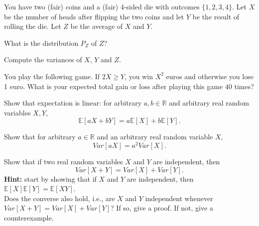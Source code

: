 \documentclass[a4paper,10pt,landscape,twocolumn]{scrartcl}
\begin{document}
\homeworkproblems

\begin{exercise}
	You have two (fair) coins and a (fair) 4-sided die with outcomes $\{1,2,3,4\}$. Let $X$ be the number of
	heads after flipping the two coins and let $Y$ be the result of rolling the
	die. Let $Z$ be the average of $X$ and $Y$.
	\begin{subex}[(2pt)]
		What is the distribution $P_Z$ of $Z$?
	\end{subex}
	\begin{subex}[(3pt)]
		Compute the variances of $X$, $Y$ and $Z$.	
	\end{subex}
	\begin{subex}[(2pt)]
		You play the following game. If $2X \ge Y$, you win $X^2$ euros and
		otherwise you lose 1 euro. What is your expected total gain or loss after
		playing this game $40$ times?
	\end{subex}
\end{exercise}

\begin{exercise}
	\begin{subex}[(2pt)]
		Show that expectation is linear: for arbitrary $a,b \in \mathbb{R}$ and arbitrary real random variables $X,Y$,
		\[
		\mathbb{E}[aX + bY] = a\mathbb{E}[X] + b \mathbb{E}[Y].
		\]
	\end{subex}
	\begin{subex}[(2pt)]
		Show that for arbitrary $a \in \mathbb{R}$ and an arbitrary real random variable $X$,
		\[
		Var[aX] = a^2Var[X].
		\]
	\end{subex}
	\begin{subex}[(3pt)]
		Show that if two real random variables $X$ and $Y$ are independent, then
		\[Var[X+Y] = Var[X] + Var[Y].\]
		\textbf{Hint:} start by showing that if $X$ and $Y$ are independent, then $\mathbb{E}[X]\mathbb{E}[Y] = \mathbb{E}[XY]$.
		\\ Does the converse also hold, i.e., are $X$ and $Y$ independent whenever $Var[X+Y] = Var[X] + Var[Y]$? If so, give a proof. If not, give a counterexample.
	\end{subex}
\end{exercise}
\end{document}
